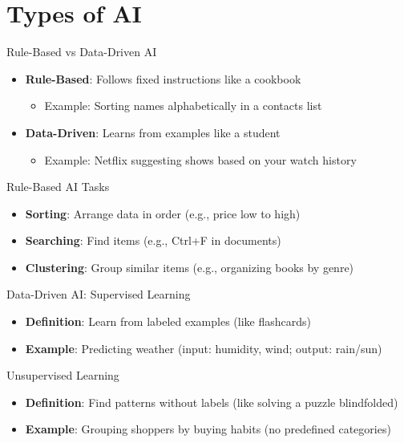 \documentclass{beamer}
\begin{document}
\section{Types of AI}
\begin{frame}{Rule-Based vs Data-Driven AI}
\begin{itemize}
\item \textbf{Rule-Based}: Follows fixed instructions like a cookbook
  \begin{itemize}
  \item Example: Sorting names alphabetically in a contacts list
  \end{itemize}
\item \textbf{Data-Driven}: Learns from examples like a student
  \begin{itemize}
  \item Example: Netflix suggesting shows based on your watch history
  \end{itemize}
\end{itemize}
\end{frame}

\begin{frame}{Rule-Based AI Tasks}
\begin{itemize}
\item \textbf{Sorting}: Arrange data in order (e.g., price low to high)
\item \textbf{Searching}: Find items (e.g., Ctrl+F in documents)
\item \textbf{Clustering}: Group similar items (e.g., organizing books by genre)
\end{itemize}
\end{frame}

\begin{frame}{Data-Driven AI: Supervised Learning}
\begin{itemize}
\item \textbf{Definition}: Learn from labeled examples (like flashcards)
\item \textbf{Example}: Predicting weather (input: humidity, wind; output: rain/sun)
\end{itemize}
\end{frame}

\begin{frame}{Unsupervised Learning}
\begin{itemize}
\item \textbf{Definition}: Find patterns without labels (like solving a puzzle blindfolded)
\item \textbf{Example}: Grouping shoppers by buying habits (no predefined categories)
\end{itemize}
\end{frame}
\end{document}
